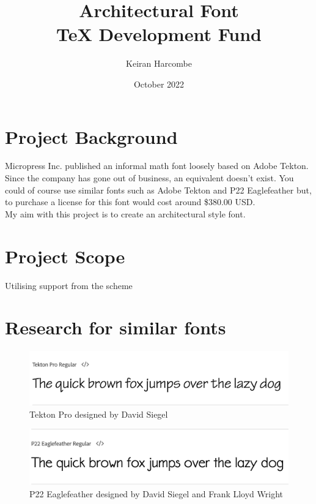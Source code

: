 \documentclass[a4paper]{article}
\title{Architectural Font \\ TeX Development Fund}
\author{Keiran Harcombe}
\date{October 2022}
\begin{document}
\maketitle
\section{Project Background} %
Micropress Inc. published an informal math font loosely based on Adobe Tekton. Since the company has gone out of business, an equivalent doesn't exist. You could of course use similar fonts such as Adobe Tekton and P22 Eaglefeather but, to purchase a license for this font would cost around \$380.00 USD. \\
My aim with this project is to create an architectural style font. 

\section{Project Scope} %
Utilising support from the scheme
\pagebreak

\section{Research for similar fonts}
    \begin{figure}[h]
        \includegraphics[width=1\textwidth]{Tekton.png}
        \caption{Tekton Pro designed by David Siegel}
        \label{fig:tekton}
    \end{figure}
    
    \begin{figure}[h]
        \includegraphics[width=1\textwidth]{Eaglefeather.png}
        \caption{P22 Eaglefeather designed by David Siegel and Frank Lloyd Wright}
        \label{fig:eaglefeather}
    \end{figure}
\end{document}
